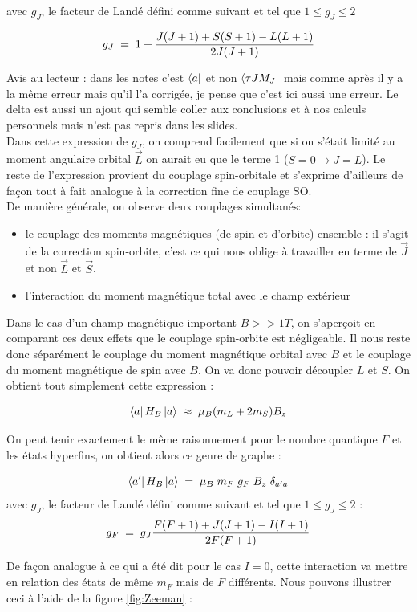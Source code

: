 avec $g_J$, le facteur de Landé défini comme suivant et tel que $1\leq g_J \leq 2$

\[
    g_J \; = \;  1 + \dfrac{J(J+1) + S(S+1) - L(L+1)}{2J(J+1)}
\]

Avis au lecteur : dans les notes c'est $\bra{a}$ et non $\bra{\tau J M_J}$ mais comme après il y a la même erreur mais qu'il l'a corrigée, je pense que c'est ici aussi une erreur. Le delta est aussi un ajout qui semble coller aux conclusions et à nos calculs personnels mais n'est pas repris dans les slides.\\

Dans cette expression de $g_J$, on comprend facilement que si on s'était limité au moment angulaire orbital $\vec{L}$ on aurait eu que le terme 1 ($S=0 \rightarrow J=L$). Le reste de l'expression provient du couplage spin-orbitale et s'exprime d'ailleurs de façon tout à fait analogue à la correction fine de couplage SO.\\

De manière générale, on observe deux couplages simultanés:
\begin{itemize}[label=$\bullet$]
    \item le couplage des moments magnétiques (de spin et d'orbite) ensemble : il s'agit de la correction spin-orbite, c'est ce qui nous oblige à travailler en terme de $\vec{J}$ et non $\vec{L}$ et $\vec{S}$.
    \item l'interaction du moment magnétique total avec le champ extérieur
\end{itemize}
Dans le cas d'un champ magnétique important $B>>1T$, on s'aperçoit en comparant ces deux effets que le couplage spin-orbite est négligeable. Il nous reste donc séparément le couplage du moment magnétique orbital avec $B$ et le couplage du moment magnétique de spin avec $B$. On va donc pouvoir découpler $L$ et $S$. On obtient tout simplement cette expression :

\[
    \bra{a}H_B\ket{a} \; \approx \; \mu_B(m_L + 2m_S)B_z
\]

On peut tenir exactement le même raisonnement pour le nombre quantique $F$ et les états hyperfins, on obtient alors ce genre de graphe :

\[
    \bra{a'}H_B\ket{a} \; = \; \mu_B \; m_F \; g_F \; B_z \;\delta_{a'a}
\]
avec $g_J$, le facteur de Landé défini comme suivant et tel que $1\leq g_J \leq 2$ :
\[
    g_F \; = \;  g_J \dfrac{F(F+1) + J(J+1) - I(I+1)}{2F(F+1)}
\]


De façon analogue à ce qui a été dit pour le cas $I=0$, cette interaction va mettre en relation des états de même $m_F$ mais de $F$ différents. Nous pouvons illustrer ceci à l'aide de la figure \eqref{fig:Zeeman} :\\

